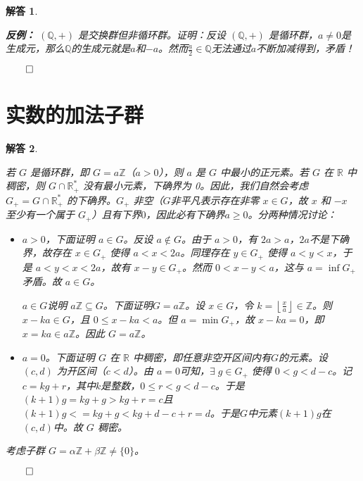 \documentclass[12pt,UTF8]{ctexbook}
\theoremstyle{exercisestyle}
\theoremstyle{solutionstyle}
\newtheorem*{solution*}{解答}
\newenvironment{solution}
  {\begin{solution*}}
  {\hfill\ensuremath{\qed}\end{solution*}}
\begin{document}
\begin{solution}
\begin{subquestions}
        \textbf{反例：} $(\mathbb{Q},+)$ 是交换群但非循环群。证明：反设 $(\mathbb{Q},+)$ 是循环群，$a\neq 0$是生成元，那么$\mathbb{Q}$的生成元就是$a$和$-a$。然而$\displaystyle\frac{a}{2}\in \mathbb{Q}$无法通过$a$不断加减得到，矛盾！
    \end{subquestions}
\end{solution}

\section{实数的加法子群}
\begin{solution}
  \begin{subquestions}
  \item 若 \(G\) 是循环群，即 \(G = a\mathbb{Z}\)（\(a > 0\)），则 \(a\) 是 \(G\) 中最小的正元素。若 \(G\) 在 \(\mathbb{R}\) 中稠密，则 \(G \cap \mathbb{R}_+^*\) 没有最小元素，下确界为 0。因此，我们自然会考虑 \(G_+ = G \cap \mathbb{R}_+^*\) 的下确界。\(G_+\) 非空（$G$非平凡表示存在非零 \(x \in G\)，故 \(x\) 和 \(-x\) 至少有一个属于 \(G_+\)）且有下界$0$，因此必有下确界$a \geqslant 0$。分两种情况讨论：
  
  \begin{itemize}
    \item \(a > 0\)，下面证明 \(a \in G\)。反设 \(a \notin G\)。由于 \(a > 0\)，有 \(2a > a\)，$2a$不是下确界，故存在 \(x \in G_+\) 使得 \(a < x < 2a\)。同理存在 \(y \in G_+\) 使得 \(a < y < x\)，于是 \(a < y < x < 2a\)，故有 \(x - y \in G_+\)。然而 \(0 < x - y < a\)，这与 \(a = \inf G_+\) 矛盾。故 \(a \in G\)。
    
    \(a \in G\)说明 \(a\mathbb{Z} \subseteq G\)。下面证明\(G = a\mathbb{Z}\)。设 \(x \in G\)，令 \(k = \left\lfloor \frac{x}{a} \right\rfloor \in \mathbb{Z}\)。则 \(x - ka \in G\)，且 \(0 \leqslant x - ka < a\)。但 \(a = \min G_+\)，故 \(x - ka = 0\)，即 \(x = ka \in a\mathbb{Z}\)。因此 \(G = a\mathbb{Z}\)。
    
    \item \(a = 0\)。下面证明 \(G\) 在 \(\mathbb{R}\) 中稠密，即任意非空开区间内有$G$的元素。设 \((c, d)\) 为开区间（\(c < d\)）。由 \(a = 0\)可知，\(\exists \; g \in G_+\) 使得 \(0 < g < d - c\)。记$c = kg + r$，其中$k$是整数，$0\leqslant r < g < d - c$。于是$(k + 1)g = kg + g > kg + r = c$且$(k + 1)g < = kg + g < kg + d - c + r = d$。于是$G$中元素$(k + 1)g$在$(c, d)$中。故 \(G\) 稠密。
  \end{itemize}
    \item 考虑子群 \(G = \alpha \mathbb{Z} + \beta \mathbb{Z} \neq \{0\}\)。
    

\end{subquestions}
\end{solution}
\end{document}
